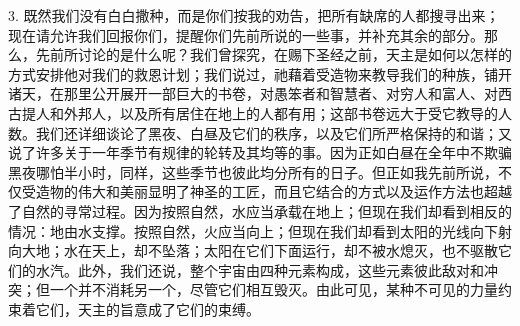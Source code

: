 3. 既然我们没有白白撒种，而是你们按我的劝告，把所有缺席的人都搜寻出来；现在请允许我们回报你们，提醒你们先前所说的一些事，并补充其余的部分。那么，先前所讨论的是什么呢？我们曾探究，在赐下圣经之前，天主是如何以怎样的方式安排他对我们的救恩计划；我们说过，祂藉着受造物来教导我们的种族，铺开诸天，在那里公开展开一部巨大的书卷，对愚笨者和智慧者、对穷人和富人、对西古提人和外邦人，以及所有居住在地上的人都有用；这部书卷远大于受它教导的人数。我们还详细谈论了黑夜、白昼及它们的秩序，以及它们所严格保持的和谐；又说了许多关于一年季节有规律的轮转及其均等的事。因为正如白昼在全年中不欺骗黑夜哪怕半小时，同样，这些季节也彼此均分所有的日子。但正如我先前所说，不仅受造物的伟大和美丽显明了神圣的工匠，而且它结合的方式以及运作方法也超越了自然的寻常过程。因为按照自然，水应当承载在地上；但现在我们却看到相反的情况：地由水支撑。按照自然，火应当向上；但现在我们却看到太阳的光线向下射向大地；水在天上，却不坠落；太阳在它们下面运行，却不被水熄灭，也不驱散它们的水汽。此外，我们还说，整个宇宙由四种元素构成，这些元素彼此敌对和冲突；但一个并不消耗另一个，尽管它们相互毁灭。由此可见，某种不可见的力量约束着它们，天主的旨意成了它们的束缚。\par

